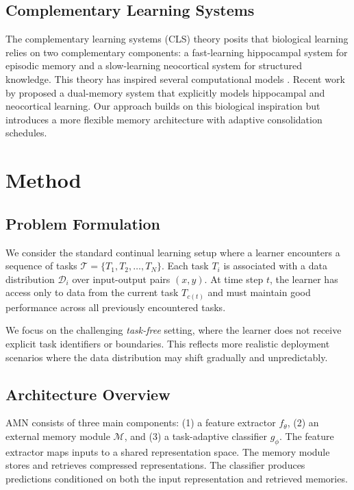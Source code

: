 \documentclass[11pt]{article}
\begin{document}
\subsection{Complementary Learning Systems}

The complementary learning systems (CLS) theory \citep{mcclelland1995there} posits that biological learning relies on two complementary components: a fast-learning hippocampal system for episodic memory and a slow-learning neocortical system for structured knowledge. This theory has inspired several computational models \citep{kumaran2016learning, zenke2017continual}. Recent work by \citet{arani2022learning} proposed a dual-memory system that explicitly models hippocampal and neocortical learning. Our approach builds on this biological inspiration but introduces a more flexible memory architecture with adaptive consolidation schedules.

\section{Method}
\label{sec:method}

\subsection{Problem Formulation}

We consider the standard continual learning setup where a learner encounters a sequence of tasks $\mathcal{T} = \{T_1, T_2, \ldots, T_N\}$. Each task $T_i$ is associated with a data distribution $\mathcal{D}_i$ over input-output pairs $(x, y)$. At time step $t$, the learner has access only to data from the current task $T_{c(t)}$ and must maintain good performance across all previously encountered tasks.

We focus on the challenging \emph{task-free} setting, where the learner does not receive explicit task identifiers or boundaries. This reflects more realistic deployment scenarios where the data distribution may shift gradually and unpredictably.

\subsection{Architecture Overview}

AMN consists of three main components: (1) a feature extractor $f_\theta$, (2) an external memory module $\mathcal{M}$, and (3) a task-adaptive classifier $g_\phi$. The feature extractor maps inputs to a shared representation space. The memory module stores and retrieves compressed representations. The classifier produces predictions conditioned on both the input representation and retrieved memories.
\end{document}
